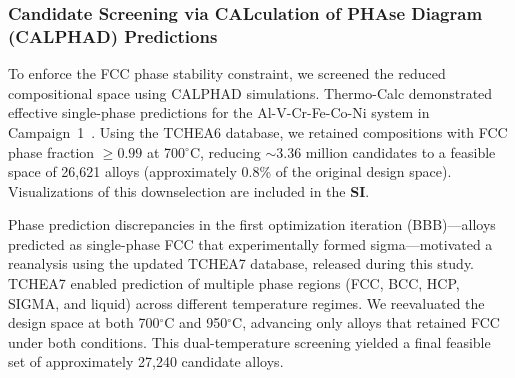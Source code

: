 \documentclass[preprint,12pt,times]{elsarticle}  %
\begin{document}


\subsubsection{Candidate Screening via CALculation of PHAse Diagram (CALPHAD) Predictions}

To enforce the FCC phase stability constraint, we screened the reduced compositional space using CALPHAD simulations. Thermo-Calc demonstrated effective single-phase predictions for the Al-V-Cr-Fe-Co-Ni system in Campaign~1~\cite{hastings2025accelerated}. Using the TCHEA6 database, we retained compositions with FCC phase fraction $\geq 0.99$ at 700$^\circ$C, reducing $\sim$3.36 million candidates to a feasible space of 26,621 alloys (approximately 0.8\% of the original design space). Visualizations of this downselection are included in the \textbf{SI}.

Phase prediction discrepancies in the first optimization iteration (BBB)---alloys predicted as single-phase FCC that experimentally formed sigma---motivated a reanalysis using the updated TCHEA7 database, released during this study. TCHEA7 enabled prediction of multiple phase regions (FCC, BCC, HCP, SIGMA, and liquid) across different temperature regimes. We reevaluated the design space at both 700$^\circ$C and 950$^\circ$C, advancing only alloys that retained FCC under both conditions. This dual-temperature screening yielded a final feasible set of approximately 27,240 candidate alloys.
\end{document}

